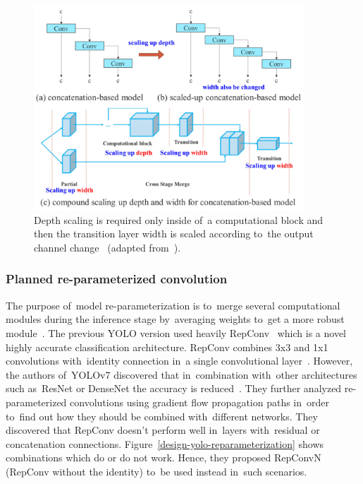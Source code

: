 \begin{figure}[hbt]
    \centering
    \includegraphics[width=0.9\textwidth]{img/design/yolov7-scaling.png}
    \caption{Depth scaling is required only inside of~a computational block and then the transition layer width is scaled according to~the output channel change~\cite{yolov7} (adapted from~\cite{yolov7}).}
    \label{design-yolo-scaling}
\end{figure}

\subsubsection{Planned re-parameterized convolution}
The purpose of~model re-parameterization is to~merge several computational modules \hbox{during} the inference stage by~averaging weights to~get a more robust module~\cite{yolov7}.
The previous YOLO version used heavily RepConv~\cite{rep-conv} which is a novel highly accurate classification architecture. RepConv combines 3x3 and 1x1 convolutions with~identity connection in~a single convolutional layer~\cite{yolov7}. However, the authors of~YOLOv7 discovered that in~combination with~other architectures such as~ResNet or DenseNet the accuracy is reduced~\cite{yolov7}. They further analyzed re-parameterized convolutions using gradient flow propagation paths in~order to~find out how they should be combined with~different networks. They discovered that RepConv doesn't perform well in~layers with~residual or concatenation connections. Figure~\ref{design-yolo-reparameterization} shows combinations which do or do not work. Hence, they proposed RepConvN (RepConv without the identity) to~be used instead in~such scenarios.

